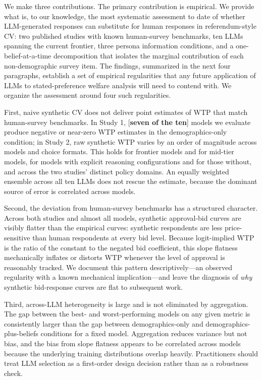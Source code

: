 \documentclass[12pt]{article}
\begin{document}
We make three contributions. The primary contribution is empirical. We
provide what is, to our knowledge, the most systematic assessment to date
of whether LLM-generated responses can substitute for human responses in
referendum-style CV: two published studies with known human-survey
benchmarks, ten LLMs spanning the current frontier, three persona
information conditions, and a one-belief-at-a-time decomposition that
isolates the marginal contribution of each non-demographic survey item.
The findings, summarized in the next four paragraphs, establish a set of
empirical regularities that any future application of LLMs to
stated-preference welfare analysis will need to contend with. We organize
the assessment around four such regularities.

First, naive synthetic CV does not deliver point estimates of WTP that
match human-survey benchmarks. In Study 1, [\textbf{seven of the ten}]
models we evaluate produce negative or near-zero WTP estimates in the
demographics-only condition; in Study 2, raw synthetic WTP varies by an
order of magnitude across models and choice formats. This holds for
frontier models and for mid-tier models, for models with explicit reasoning
configurations and for those without, and across the two studies' distinct
policy domains. An equally weighted ensemble across all ten LLMs does not
rescue the estimate, because the dominant source of error is correlated
across models.

Second, the deviation from human-survey benchmarks has a structured
character. Across both studies and almost all models, synthetic
approval-bid curves are visibly flatter than the empirical curves: synthetic
respondents are less price-sensitive than human respondents at every bid
level. Because logit-implied WTP is the ratio of the constant to the
negated bid coefficient, this slope flatness mechanically inflates or
distorts WTP whenever the level of approval is reasonably tracked. We
document this pattern descriptively---an observed regularity with a known
mechanical implication---and leave the diagnosis of \emph{why} synthetic
bid-response curves are flat to subsequent work.

Third, across-LLM heterogeneity is large and is not eliminated by
aggregation. The gap between the best- and worst-performing models on any
given metric is consistently larger than the gap between demographics-only
and demographics-plus-beliefs conditions for a fixed model. Aggregation
reduces variance but not bias, and the bias from slope flatness appears
to be correlated across models because the underlying training distributions
overlap heavily. Practitioners should treat LLM selection as a first-order
design decision rather than as a robustness check.
\end{document}

